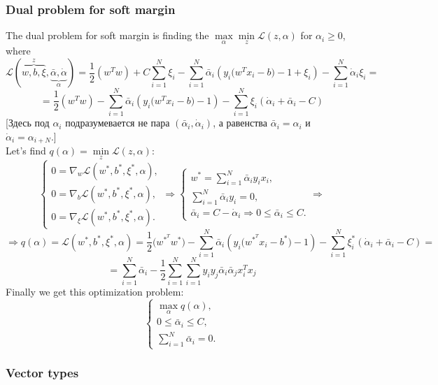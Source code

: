 \subsubsection*{Dual problem for soft margin}

The dual problem for soft margin is finding the $\max\limits_{\alpha}\min\limits_{z}\mathcal{L}(z,\alpha)$ for $\alpha_i\ge0$, where
$$\mathcal{L}(\overbrace{w,b,\xi}^{z},\underbrace{\bar\alpha,\dot\alpha}_{\alpha})=\frac{1}{2}(w^Tw)+C\sum\limits_{i=1}^{N}\xi_i-\sum\limits_{i=1}^{N}\bar\alpha_i(y_i\big(w^Tx_i-b\big)-1+\xi_i)-\sum\limits_{i=1}^{N}\dot\alpha_i\xi_i=$$
$$=\frac{1}{2}(w^Tw)-\sum\limits_{i=1}^{N}\bar\alpha_i(y_i\big(w^Tx_i-b\big)-1)-\sum\limits_{i=1}^{N}\xi_i(\dot\alpha_i+\bar\alpha_i-C)$$
[Здесь под $\alpha_i$ подразумевается не пара $(\bar\alpha_i,\dot\alpha_i)$, а равенства $\bar\alpha_i = \alpha_i$ и $\dot\alpha_i=\alpha_{i+N}$.]\\
Let's find $q(\alpha)=\min\limits_{z}\mathcal{L}(z,\alpha)$:
$$\begin{cases}
	0=\nabla_w\mathcal{L}(w^*,b^*,\xi^*,\alpha), \\
	0=\nabla_b\mathcal{L}(w^*,b^*,\xi^*,\alpha), \\
	0=\nabla_\xi\mathcal{L}(w^*,b^*,\xi^*,\alpha).
\end{cases}\Longrightarrow
\begin{cases}
	w^*=\sum\limits_{i=1}^{N}\bar\alpha_iy_ix_i, \\
	\sum\limits_{i=1}^{N}\bar\alpha_iy_i=0, \\
	\bar\alpha_i=C-\dot\alpha_i\Rightarrow 0\le\bar\alpha_i\le C.
\end{cases}\Longrightarrow$$
$$\Longrightarrow q(\alpha)=\mathcal{L}(w^*,b^*,\xi^*,\alpha)=\frac{1}{2}\big(w^{*^T}w^*\big)-\sum\limits_{i=1}^{N}\bar\alpha_i(y_i\big(w^{*^T}x_i-b^*\big)-1)-\sum\limits_{i=1}^{N}\xi_i^*(\dot\alpha_i+\bar\alpha_i-C)=$$
$$=\sum\limits_{i=1}^{N}\bar\alpha_i-\frac{1}{2}\sum\limits_{i=1}^{N}\sum\limits_{i=1}^{N}y_iy_j\bar\alpha_i\bar\alpha_jx_i^Tx_j$$
Finally we get this optimization problem:
$$\begin{cases}
	\max_{\alpha}q(\alpha), \\
	0\le\bar\alpha_i\le C, \\
	\sum\limits_{i=1}^{N}\bar\alpha_i=0.
\end{cases}$$

\subsubsection*{Vector types}

